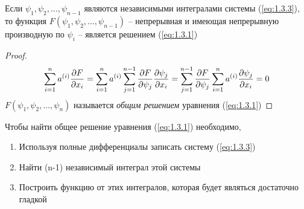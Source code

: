 \documentclass[../main.tex]{subfiles}
\begin{document}
\begin{theorem}
	Если $\psi_1, \psi_2, \dots, \psi_{n-1}$ являются независимыми интегралами системы (\ref*{eq:1.3.3}),
	то функция $F(\psi_1, \psi_2, \dots, \psi_{n-1})$ -- непрерывная и имеющая непрерывную
	производную по $\psi_i$ -- является решением (\ref*{eq:1.3.1})
\end{theorem}
\begin{proof}
	\begin{gather*}
		\sum_{i=1}^n a^{(i)}\frac{\partial F}{\partial x_i} =
		\sum_{i=1}^n a^{(i)} \sum_{j=1}^{n-1}\frac{\partial F}{\partial \psi_j}\frac{\partial \psi_j}{\partial x_i} =
		\sum_{j=1}^{n-1} \frac{\partial F}{\partial \psi_j}\sum_{i=1}^n a^{(i)} \frac{\partial \psi_j}{\partial x_i} = 0
	\end{gather*}
	$F(\psi_1, \psi_2,\dots,\psi_n)$ называется \textit{общим решением} уравнения (\ref*{eq:1.3.1})
\end{proof}
Чтобы найти общее решение уравнения (\ref*{eq:1.3.1}) необходимо,
\begin{enumerate}
	\item Используя полные дифференциалы записать систему (\ref*{eq:1.3.3})
	\item Найти (n-1) независимый интеграл этой системы
	\item Построить функцию от этих интегралов, которая будет являться достаточно гладкой
\end{enumerate}
\end{document}
